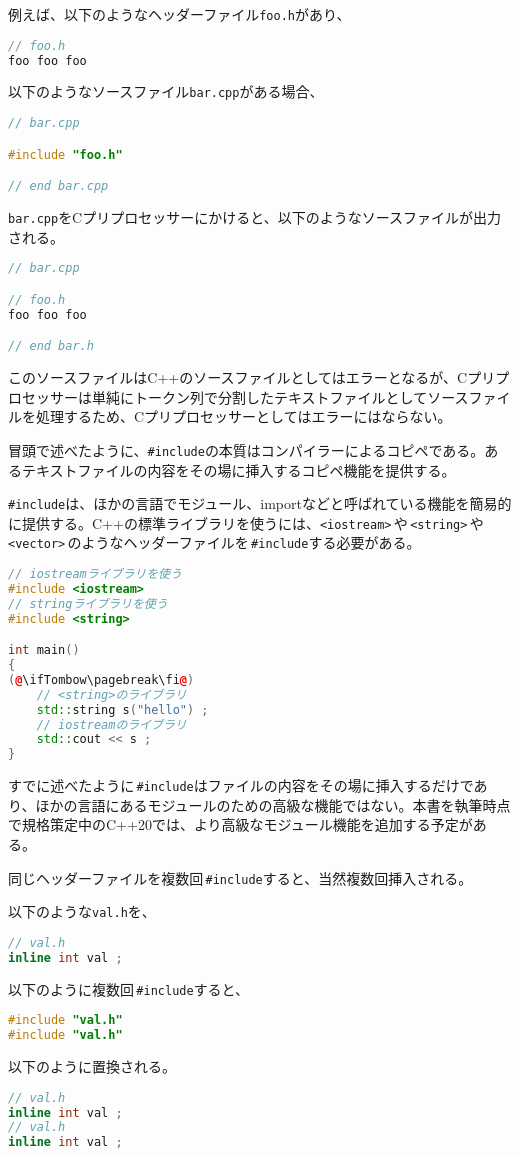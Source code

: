 例えば、以下のようなヘッダーファイル\texttt{foo.h}があり、
\begin{lstlisting}[language={C++}]
// foo.h
foo foo foo
\end{lstlisting}
以下のようなソースファイル\texttt{bar.cpp}がある場合、
\begin{lstlisting}[language={C++}]
// bar.cpp

#include "foo.h"

// end bar.cpp
\end{lstlisting}
\texttt{bar.cpp}をCプリプロセッサーにかけると、以下のようなソースファイルが出力される。

\begin{lstlisting}[language={C++}]
// bar.cpp

// foo.h
foo foo foo

// end bar.h
\end{lstlisting}

このソースファイルはC++のソースファイルとしてはエラーとなるが、Cプリプロセッサーは単純にトークン列で分割したテキストファイルとしてソースファイルを処理するため、Cプリプロセッサーとしてはエラーにはならない。

冒頭で述べたように、\texttt{\#include}の本質はコンパイラーによるコピペである。あるテキストファイルの内容をその場に挿入するコピペ機能を提供する。

\texttt{\#include}は、ほかの言語でモジュール、importなどと呼ばれている機能を簡易的に提供する。C++の標準ライブラリを使うには、\texttt{<iostream>}\,や\,\texttt{<string>}\,や\,\texttt{<vector>}\,のようなヘッダーファイルを\,\texttt{\#include}する必要がある。

\begin{lstlisting}[language={C++}]
// iostreamライブラリを使う
#include <iostream>
// stringライブラリを使う
#include <string>

int main()
{
(@\ifTombow\pagebreak\fi@)
    // <string>のライブラリ
    std::string s("hello") ;
    // iostreamのライブラリ
    std::cout << s ;
}
\end{lstlisting}

すでに述べたように\,\texttt{\#include}はファイルの内容をその場に挿入するだけであり、ほかの言語にあるモジュールのための高級な機能ではない。本書を執筆時点で規格策定中のC++20では、より高級なモジュール機能を追加する予定がある。

同じヘッダーファイルを複数回\,\texttt{\#include}すると、当然複数回挿入される。

以下のような\texttt{val.h}を、
\begin{lstlisting}[language={C++}]
// val.h
inline int val ;
\end{lstlisting}
以下のように複数回\,\texttt{\#include}すると、
\begin{lstlisting}[language={C++}]
#include "val.h"
#include "val.h"
\end{lstlisting}
以下のように置換される。
\begin{lstlisting}[language={C++}]
// val.h
inline int val ;
// val.h
inline int val ;
\end{lstlisting}

